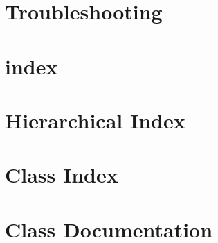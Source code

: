 \let\mypdfximage\pdfximage\def\pdfximage{\immediate\mypdfximage}\documentclass[twoside]{book}
\newcommand{\+}{\discretionary{\mbox{\scriptsize$\hookleftarrow$}}{}{}}
\newcommand{\clearemptydoublepage}{%
  \newpage{\pagestyle{empty}\cleardoublepage}%
}
\begin{document}
\chapter{Troubleshooting}
\label{md_lib_async_mqtt_client_master_docs_5___troubleshooting}

\chapter{index}
\label{md_lib_async_mqtt_client_master_docs_index}

\chapter{Hierarchical Index}

\chapter{Class Index}

\chapter{Class Documentation}


















\backmatter
\newpage
{}
\clearemptydoublepage
{}
\printindex
\end{document}
